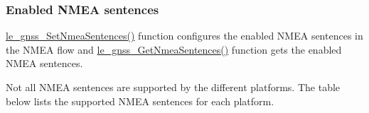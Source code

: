 \hypertarget{platformConstraintsGnss_platformConstraintsGnss_nmeaMask}{}\subsubsection{Enabled N\+M\+E\+A sentences}\label{platformConstraintsGnss_platformConstraintsGnss_nmeaMask}
{\ttfamily \hyperlink{le__gnss__interface_8h_ab9253e29d74cae6e962dcc8b94f0e3c1}{le\+\_\+gnss\+\_\+\+Set\+Nmea\+Sentences()}} function configures the enabled N\+M\+EA sentences in the N\+M\+EA flow and {\ttfamily \hyperlink{le__gnss__interface_8h_a985845ac33d35c34ac3099b6557ca8ea}{le\+\_\+gnss\+\_\+\+Get\+Nmea\+Sentences()}} function gets the enabled N\+M\+EA sentences.

Not all N\+M\+EA sentences are supported by the different platforms. The table below lists the supported N\+M\+EA sentences for each platform.


